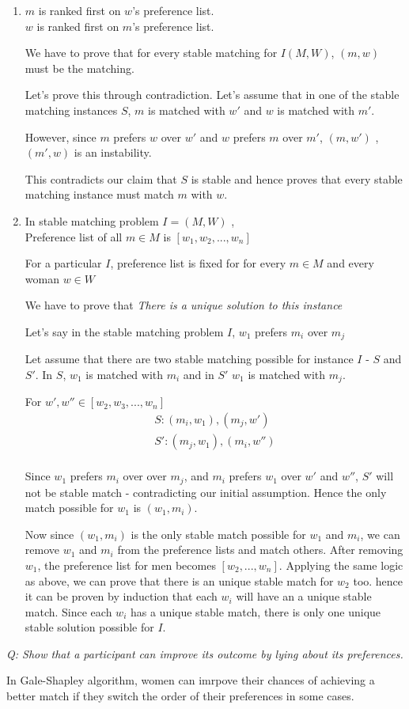 \documentclass{homeworg}
\begin{document}
\exercise
\begin{enumerate}[label=\alph*)]
\item 
$m$ is ranked first on $w$'s preference list.\\
$w$ is ranked first on $m$'s preference list.

We have to prove that for every stable matching for $I(M,W)$, $(m,w)$ must be the matching.

Let's prove this through contradiction. Let's assume that in one of the stable matching instances $S$, $m$ is matched with $w'$  and $w$ is matched with $m'$.

However, since $m$ prefers $w$ over $w'$ and $w$ prefers $m$ over $m'$, $(m,w')$ , $(m',w)$ is an instability.

This contradicts our claim that $S$ is stable and hence proves that every stable matching instance must match $m$ with $w$.

\item In stable matching problem $I =(M,W)$ ,\\
Preference list of all $m \in M$ is $[w_1,w_2,. .., w_n]$


For a particular $I$, preference list is fixed for for every $m \in M$ and every woman $w \in W$ 

We have to prove that \emph{There is a unique solution to this instance}

Let's say in the stable matching problem $I$, $w_1$ prefers $m_i$ over $m_j$

Let assume that there are two stable matching possible for instance $I$ - $S$ and $S'$.  In $S$, $w_1$ is matched with $m_i$ and in $S'$ $w_1$ is matched with $m_j$.

For $w', w'' \in [w_2,w_3,. .., w_n]$
\begin{align*}
    S : (m_i,w_1),(m_j,w')\\
    S' : (m_j,w_1),(m_i,w'')\\
\end{align*}

Since $w_1$ prefers $m_i$ over over $m_j$, and $m_i$  prefers $w_1$ over $w'$ and $w''$, $S'$ will not be stable match - contradicting our initial assumption. Hence the only match possible for $w_1$ is $(w_1,m_i)$.

Now since $(w_1,m_i)$ is the only stable match possible for $w_1$ and $m_i$, we can remove $w_1$ and $m_i$ from the preference lists and match others. After removing  $w_1$, the preference list for men becomes $[w_2,. .., w_n]$. Applying the same logic as above, we can prove that there is an unique stable match for $w_2$ too. hence it can be proven by induction that each $w_i$ will have an a unique stable match. Since each $w_i$ has a unique stable match, there is only one unique stable solution possible for $I$.

\end{enumerate}

\newpage

\exercise
\emph{Q: Show that a participant can improve its outcome by lying about its preferences.}

In Gale-Shapley algorithm, women can imrpove their chances of achieving a better match if they switch the order of their preferences in some cases.
\end{document}
